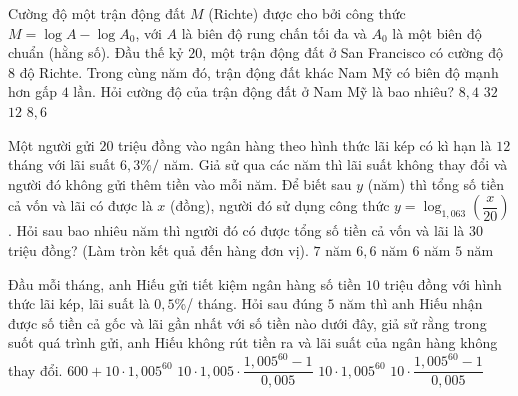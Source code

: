 \begin{ex}%
	Cường độ một trận động đất $M$ (Richte) được cho bởi công thức $M = \log A - \log A_0$, với $A$ là biên  độ rung chấn tối đa và $A_0$ là một biên độ chuẩn (hằng số). Đầu thế kỷ $20$, một trận động đất ở San Francisco có cường độ $8$ độ Richte. Trong cùng năm đó, trận động đất khác Nam Mỹ có biên độ mạnh hơn gấp $4$ lần. Hỏi cường độ của trận động đất ở Nam Mỹ là bao nhiêu?
	\choice 
		 {$8{,}4$}
		{$32$} 
		{$12$} 
		{\True  $8{,}6$}
\end{ex}

\begin{ex}%
	Một người gửi $20$ triệu đồng vào ngân hàng theo hình thức lãi kép có kì hạn là $12$ tháng với lãi suất $6{,}3\% /$ năm. Giả sử qua các năm thì lãi suất không thay đổi và người đó không gửi thêm tiền vào mỗi năm. Để biết sau $y$ (năm) thì tổng số tiền cả vốn và lãi có được là $x$ (đồng), người đó sử dụng công thức $y = \log_{1{,}063} \left(\dfrac{x}{20}\right)$.  Hỏi sau bao nhiêu năm thì người đó có được tổng số tiền cả vốn và lãi là $30$ triệu đồng? (Làm tròn kết quả đến hàng đơn vị).
	\choice 
		{\True  $7$ năm}
		 {$6{,}6$ năm}
		 {$6$ năm}
		{$5$  năm}
\end{ex}

\begin{ex}%
	Đầu mỗi tháng, anh Hiếu gửi tiết kiệm ngân hàng số tiền $ 10 $ triệu đồng với hình thức lãi kép, lãi suất là $ 0{,}5 $\%/ tháng. Hỏi sau đúng $ 5 $ năm thì anh Hiếu nhận được số tiền cả gốc và lãi gần  nhất với số tiền nào dưới đây, giả sử rằng trong suốt quá trình gửi, anh Hiếu không rút tiền ra và lãi suất của ngân hàng không thay đổi.
	 \choice
		{$600+10\cdot 1{,}005^{60}$} 
		{\True $10\cdot 1{,}005\cdot  \dfrac{1{,}005^{60}-1}{0{,}005}$}
		{$10\cdot  1{,}005^{60}$}
		 {$10\cdot \dfrac{1{,}005^{60}-1}{0{,}005}$}
\end{ex}

